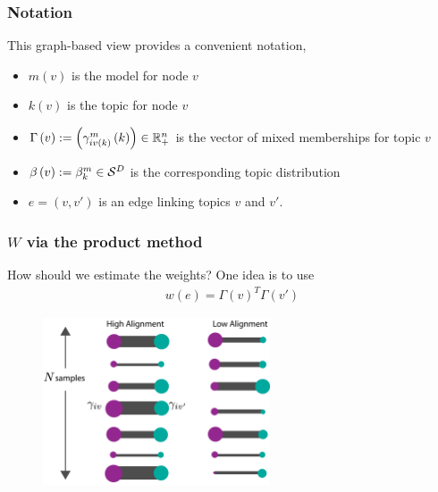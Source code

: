 \documentclass{beamer}
\begin{document}
\begin{frame}
  \frametitle{Notation}
  This graph-based view provides a convenient notation,
  \begin{itemize}
  \item $m\left(v\right)$ is the model for node $v$
  \item $k\left(v\right)$ is the topic for node $v$
  \item $\Gamma\left(v\right) := \left(\gamma_{i
  v\left(k\right)}^m\left(k\right)\right) \in \mathbb{R}^n_{+}$ is the vector of
  mixed memberships for topic $v$
  \item $\beta\left(v\right) := \beta_{k}^m \in \mathcal{S}^{D}$ is the
  corresponding topic distribution
  \item $e = \left(v, v'\right)$ is an edge linking topics $v$ and $v'$.
  \end{itemize}
\end{frame}

\begin{frame}
  \frametitle{$W$ via the product method}
How should we estimate the weights? One idea is to use
\begin{align*}
w\left(e\right) = \Gamma\left(v\right)^T\Gamma\left(v'\right)
\end{align*}
\begin{figure}
\includegraphics[width=0.6\textwidth]{product_alignment}
\end{figure}
\end{frame}
\end{document}
